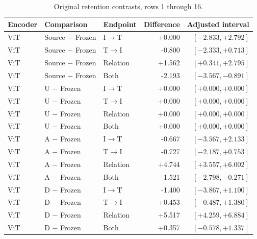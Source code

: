 \begin{table}[t]
\centering
\small
\setlength{\tabcolsep}{3pt}
\begin{tabular}{lllrr}
\toprule
Encoder & Comparison & Endpoint & Difference & Adjusted interval\\
\midrule
ViT & Source $-$ Frozen & I$\to$T & +0.000 & $[-2.833,+2.792]$ \\
ViT & Source $-$ Frozen & T$\to$I & -0.800 & $[-2.333,+0.713]$ \\
ViT & Source $-$ Frozen & Relation & +1.562 & $[+0.341,+2.795]$ \\
ViT & Source $-$ Frozen & Both & -2.193 & $[-3.567,-0.891]$ \\
ViT & U $-$ Frozen & I$\to$T & +0.000 & $[+0.000,+0.000]$ \\
ViT & U $-$ Frozen & T$\to$I & +0.000 & $[+0.000,+0.000]$ \\
ViT & U $-$ Frozen & Relation & +0.000 & $[+0.000,+0.000]$ \\
ViT & U $-$ Frozen & Both & +0.000 & $[+0.000,+0.000]$ \\
ViT & A $-$ Frozen & I$\to$T & -0.667 & $[-3.567,+2.133]$ \\
ViT & A $-$ Frozen & T$\to$I & -0.727 & $[-2.187,+0.753]$ \\
ViT & A $-$ Frozen & Relation & +4.744 & $[+3.557,+6.002]$ \\
ViT & A $-$ Frozen & Both & -1.521 & $[-2.798,-0.271]$ \\
ViT & D $-$ Frozen & I$\to$T & -1.400 & $[-3.867,+1.100]$ \\
ViT & D $-$ Frozen & T$\to$I & +0.453 & $[-0.487,+1.380]$ \\
ViT & D $-$ Frozen & Relation & +5.517 & $[+4.259,+6.884]$ \\
ViT & D $-$ Frozen & Both & +0.357 & $[-0.578,+1.337]$ \\
\bottomrule
\end{tabular}
\caption{Original retention contrasts, rows 1 through 16.}\label{tab:originalretention0}
\end{table}


